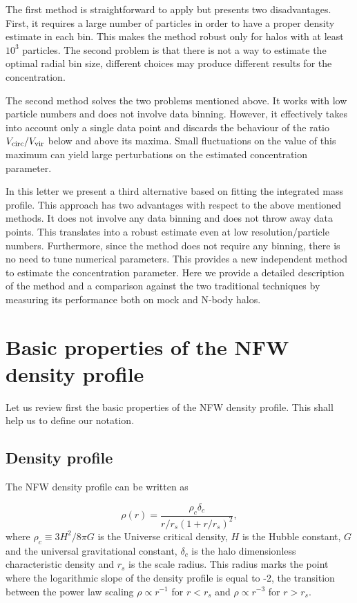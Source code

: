 \documentclass[a4,useAMS,usenatbib,usegraphicx]{mn2e}
\begin{document}
The first method is straightforward to apply but presents two
disadvantages.  
First, it requires a large number of particles in
order to have a proper density estimate in each bin.  
This makes the method robust only for halos with at least $10^3$ particles.  
The second problem is that there is not a way to estimate the optimal
radial bin size, different choices may produce different results for the
concentration.

The second method solves the two problems mentioned above.  
It works with low particle numbers and does not involve data binning.  
However, it effectively takes into account only a single data point and
discards the behaviour of the ratio $V_{\rm circ}/V_{\rm vir}$ below
and above its maxima.  
Small fluctuations on the value of this maximum can yield large
perturbations on the estimated concentration parameter.  

In this letter we present a third alternative based on fitting the
integrated mass profile.
This approach has two advantages with respect to the above mentioned
methods.  
It does not involve any data binning and does not throw away data
points. 
This translates into a robust estimate even at low resolution/particle
numbers.   
Furthermore, since the method does not require any binning, there is
no need to tune numerical parameters.
This provides a new independent method to estimate the concentration
parameter.   
Here we provide a detailed description of the method and a
comparison against the two traditional techniques by measuring its
performance both on mock and N-body halos.





\section{Basic properties of the NFW density profile}
\label{sec:basics}

Let us review first the basic properties of the NFW density profile.
This shall help us to define our notation.


\subsection{Density profile}

The NFW density profile can be written as

\begin{equation}
\rho(r) = \frac{\rho_c\delta_c}{r/r_s(1+r/r_s)^2},
\label{eq:definition}
\end{equation}
%
where $\rho_c\equiv 3H^2/8\pi G$ is the Universe critical density, $H$
is the Hubble constant, $G$ and the universal gravitational constant,
$\delta_c$ is the halo dimensionless characteristic density and $r_s$
is the scale radius. 
This radius marks the point where the logarithmic slope of the density
profile is equal to -2, the transition between the power law
scaling $\rho\propto r^{-1}$ for $r<r_s$ and $\rho\propto r^{-3}$ for
$r>r_s$. 
\end{document}
